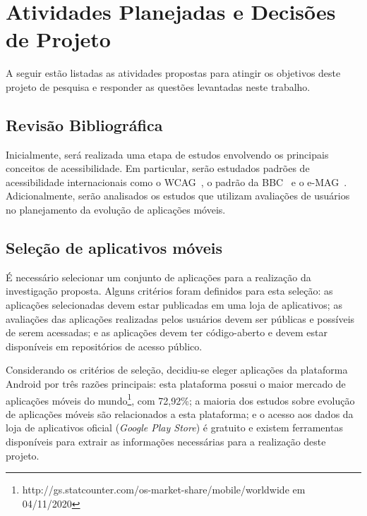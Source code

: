 \section{Atividades Planejadas e Decisões de Projeto}
\label{sec:atividadesgerais}

A seguir estão listadas as atividades propostas para atingir os objetivos deste projeto de pesquisa e responder as questões levantadas neste trabalho.

\subsection{Revisão Bibliográfica}

Inicialmente, será realizada uma etapa de estudos envolvendo os principais conceitos de acessibilidade. Em particular, serão estudados padrões de acessibilidade internacionais como o WCAG~\cite{wcag}, o padrão da BBC~\cite{bbc} e o e-MAG~\cite{emag}. Adicionalmente, serão analisados os estudos que utilizam avaliações de usuários no planejamento da evolução de aplicações móveis.

\subsection{Seleção de aplicativos móveis}
\label{sec:selecaoapps}

É necessário selecionar um conjunto de aplicações para a realização da investigação proposta. Alguns critérios foram definidos para esta seleção: as aplicações selecionadas devem estar publicadas em uma loja de aplicativos; as avaliações das aplicações realizadas pelos usuários devem ser públicas e possíveis de serem acessadas; e as aplicações devem ter código-aberto e devem estar disponíveis em repositórios de acesso público.

Considerando os critérios de seleção, decidiu-se eleger aplicações da plataforma Android por três razões principais: 
esta plataforma possui o maior mercado de aplicações móveis do mundo\footnote{http://gs.statcounter.com/os-market-share/mobile/worldwide em 04/11/2020}, com 72,92\%;
a maioria dos estudos sobre evolução de aplicações móveis são relacionados a esta plataforma; 
e o acesso aos dados da loja de aplicativos oficial (\textit{Google Play Store}) é gratuito e existem ferramentas disponíveis para extrair as informações necessárias para a realização deste projeto.


